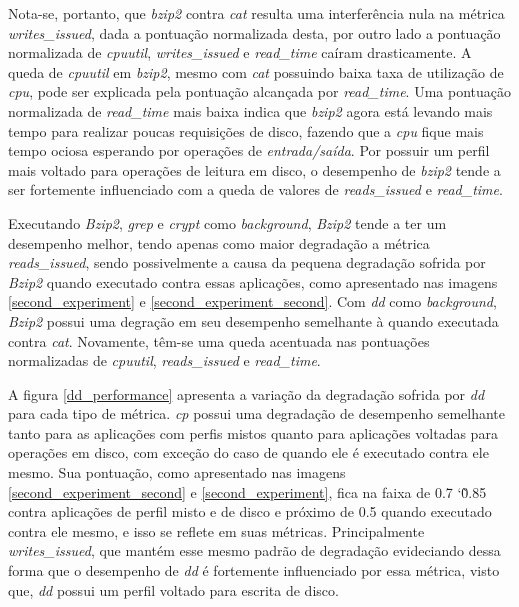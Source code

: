 Nota-se, portanto, que \textit{bzip2} contra \textit{cat} resulta uma interferência nula na métrica \textit{writes\_issued}, dada a pontuação normalizada desta, por outro lado a pontuação normalizada de \textit{cpuutil}, \textit{writes\_issued} e \textit{read\_time} caíram drasticamente. A queda de \textit{cpuutil} em \textit{bzip2}, mesmo com \textit{cat} possuindo baixa taxa de utilização de \textit{cpu}, pode ser explicada pela pontuação alcançada por \textit{read\_time}. Uma pontuação normalizada de \textit{read\_time} mais baixa indica que \textit{bzip2} agora está levando mais tempo para realizar poucas requisições de disco, fazendo que a \textit{cpu} fique mais tempo ociosa esperando por operações de \textit{entrada/saída}. Por possuir um perfil mais voltado para operações de leitura em disco, o desempenho de \textit{bzip2} tende a ser fortemente influenciado com a queda de valores de \textit{reads\_issued} e \textit{read\_time}.

Executando \textit{Bzip2}, \textit{grep} e \textit{crypt} como \textit{background}, \textit{Bzip2} tende a ter um desempenho melhor, tendo apenas como maior degradação a métrica \textit{reads\_issued}, sendo possivelmente a causa da pequena degradação sofrida por \textit{Bzip2} quando executado contra essas aplicações, como apresentado nas imagens \ref{second_experiment} e \ref{second_experiment_second}. Com \textit{dd} como \textit{background}, \textit{Bzip2} possui uma degração em seu desempenho semelhante à quando executada contra \textit{cat}. Novamente, têm-se uma queda acentuada nas pontuações normalizadas de \textit{cpuutil}, \textit{reads\_issued} e \textit{read\_time}.

A figura \ref{dd_performance} apresenta a variação da degradação sofrida por \textit{dd} para cada tipo de métrica. \textit{cp} possui uma degradação de desempenho semelhante tanto para as aplicações com perfis mistos  quanto para aplicações voltadas para operações em disco, com exceção do caso de quando ele é executado contra ele mesmo. Sua pontuação, como apresentado nas imagens \ref{second_experiment_second} e \ref{second_experiment}, fica na faixa de 0.7 \char`\~  0.85 contra aplicações de perfil misto e de disco e próximo de 0.5 quando executado contra ele mesmo, e isso se reflete em suas métricas. Principalmente \textit{writes\_issued}, que mantém esse mesmo padrão de degradação evideciando dessa forma que o desempenho de \textit{dd} é fortemente influenciado por essa métrica, visto que, \textit{dd} possui um perfil voltado para escrita de disco.
 
